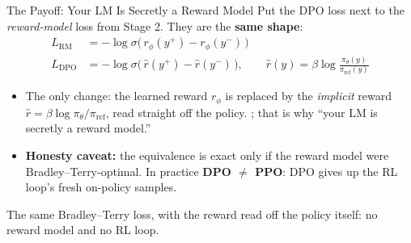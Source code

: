 \begin{frame}{The Payoff: Your LM Is Secretly a Reward Model}
Put the DPO loss next to the \emph{reward-model} loss from Stage 2. They are the \textbf{same shape}:
\begin{align*}
    L_{\mathrm{RM}}  &= -\log\sigma\big(\, r_\phi(y^+) - r_\phi(y^-) \, \big) \\[0.3em]
    L_{\mathrm{DPO}} &= -\log\sigma\big(\, \hat{r}(y^+) - \hat{r}(y^-) \, \big),
        \qquad \hat{r}(y) = \beta \log\frac{\pi_\theta(y)}{\pi_{\text{ref}}(y)}
\end{align*}
\begin{itemize}\itemsep0.25em\small
    \item The only change: the learned reward $r_\phi$ is replaced by the
          \emph{implicit} reward $\hat{r} = \beta\log\pi_\theta/\pi_{\text{ref}}$,
          read straight off the policy. ; that is why ``your LM is secretly a reward model.''
    \item \textbf{Honesty caveat:} the equivalence is exact only if the reward model
          were Bradley--Terry-optimal. In practice \textbf{DPO $\neq$ PPO}: DPO
          gives up the RL loop's fresh on-policy samples.
\end{itemize}
\vspace{0.2em}
\begin{center}
\setlength{\fboxsep}{6pt}%
\colorbox{boxgreen!50}{\parbox{0.9\textwidth}{\centering\small
The same Bradley--Terry loss, with the reward read off the policy itself:
no reward model and no RL loop. }}
\end{center}
\end{frame}

